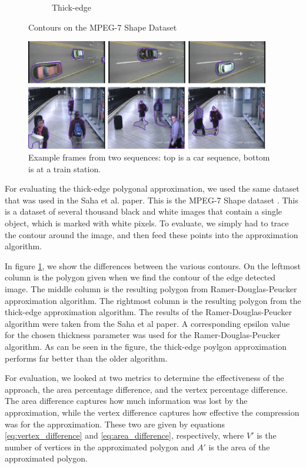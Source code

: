 \documentclass[10pt,twocolumn,letterpaper]{article}
\begin{document}
\begin{figure}
\begin{subfigure}[t]{0.15\textwidth}
        \caption{Thick-edge}
    \end{subfigure}
    \caption{Contours on the MPEG-7 Shape Dataset}
    \label{fig:mpeg7_shape}
\end{figure}

\begin{figure}
	\centering
    \includegraphics[width=0.95\textwidth]{images/surveillance_results}
    \caption{Example frames from two sequences: top is a car sequence, bottom is at a train station.}
    \label{fig:surv_results}
\end{figure}

For evaluating the thick-edge polygonal approximation, we used the same dataset that was used in the Saha et al.
\cite{Saha2017} paper. This is the MPEG-7 Shape dataset \cite{MPEG-7}. This is a dataset of several thousand black and
white images that contain a single object, which is marked with white pixels. To evaluate, we simply had to trace the
contour around the image, and then feed these points into the approximation algorithm.

In figure \ref{fig:mpeg7_shape}, we show the differences between the various contours. On the leftmost column is the
polygon given when we find the contour of the edge detected image. The middle column is the resulting polygon from
Ramer-Douglas-Peucker approximation algorithm. The rightmost column is the resulting polygon from the thick-edge
approximation algorithm. The results of the Ramer-Douglas-Peucker algorithm were taken from the Saha et al
\cite{Saha2017} paper. A corresponding epsilon value for the chosen thickness parameter was used for the
Ramer-Douglas-Peucker algorithm. As can be seen in the figure, the thick-edge poylgon approximation performs far better
than the older algorithm.

For evaluation, we looked at two metrics to determine the effectiveness of the approach, the area percentage difference,
and the vertex percentage difference. The area difference captures how much information was lost by the approximation,
while the vertex difference captures how effective the compression was for the approximation. These two are given by
equations \ref{eq:vertex_difference} and \ref{eq:area_difference}, respectively, where $V'$ is the number of vertices in
the approximated polygon and $A'$ is the area of the approximated polygon.
\end{document}
